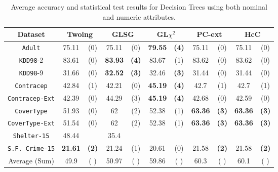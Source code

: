 \begin{table}
\small
\centering
\begin{tabular}{c|cc|cc|cc|cc|cc} 
Dataset            &\multicolumn{2}{c|}{Twoing} & \multicolumn{2}{c|}{GLSG} & \multicolumn{2}{c|}{GL$\chi^2$} & \multicolumn{2}{c|}{PC-ext}& \multicolumn{2}{c}{HcC}\\
\hline   
{\tt Adult}        & 75.11          &  (0)      & 75.11      & (0)          & {\bf 79.55} &  {\bf (4)}        & 75.11       &  (0)        & 75.11       &  (0)      \\
{\tt KDD98}-2      & 83.61          &  (0)      & {\bf 83.93}& {\bf (4)}    & 83.67       &  (1)              & 83.62       &  (0)        & 83.62       &  (0)      \\ 
{\tt KDD98}-9      & 31.66          &  (0)      &{\bf 32.52} & {\bf (3)}    & 32.46       &  {\bf (3)}        & 31.44       &  (0)        & 31.44       &  (0)      \\ 
{\tt Contracep}    & 42.84          &  (1)      & 42.21      & (0)          & {\bf 45.19} &  {\bf (4)}        & 42.7        &  (1)        & 42.7        &  (1)      \\  
{\tt Contracep-Ext}& 42.39          &  (0)      & 44.29      & (3)          & {\bf 45.19} &  {\bf (4)}        & 42.68       &  (0)        & 42.59       &  (0)      \\ 
{\tt CoverType}    & 51.93          &  (0)      & 62         & (2)          & 52.38       &  (1)              & {\bf 63.36} &  {\bf (3)}  & {\bf 63.36} & {\bf (3)} \\  
{\tt CoverType-Ext}& 51.54          &  (0)      & 62         & (2)          & 52.38       &  (1)              & {\bf 63.36} &  {\bf (3)}  & {\bf 63.36} & {\bf (3)} \\  
{\tt Shelter-15}   & 48.44          &           & 35.4       &              &             &                   &             &             &             &           \\   
{\tt S.F. Crime-15}& {\bf 21.61}    & {\bf (2)} & 21.24      & (1)          & 20.61       &  (0)              & 21.58       &  {\bf (2)}  & 21.58       & {\bf (2)} \\ 
\hline
Average (Sum)      & 49.9           & (  )      & 50.97      &  ( )         & 59.86       & (  )              & 60.3        & (  )        & 60.1        & (  )

\end{tabular}
\caption{Average accuracy and statistical test results for  Decision Trees using both nominal and numeric attributes.}
\label{exp:numeric-1}
\normalsize
\end{table}



